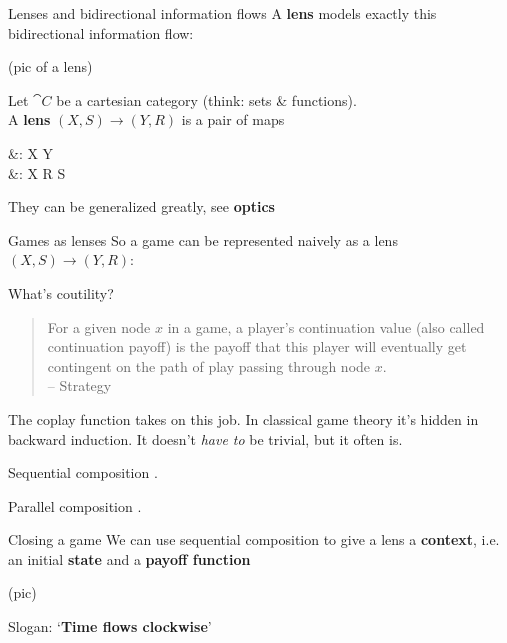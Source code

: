 \begin{frame}{Lenses and bidirectional information flows}
	A \textbf{lens} models exactly this bidirectional information flow:

	(pic of a lens)

	\begin{definition}
		Let $\cat C$ be a cartesian category (think: sets \& functions).\\
		A \textbf{lens} $(X,S) \to (Y,R)$ is a pair of maps
		\begin{eqalign*}
			 &: X \to Y\\
			 &: X \times R \to S
		\end{eqalign*}
	\end{definition}
	{\color{colornote}They can be generalized greatly, see \textbf{optics} \cite{reilly}}
\end{frame}

\begin{frame}{Games as lenses}
	So a game can be represented naively as a lens $(X,S) \to (Y,R)$:

\end{frame}

\begin{frame}{What's coutility?}

	\vfill
	\begin{quotation}
		For a given node $x$ in a game, a player’s continuation value (also called continuation payoff) is the payoff that this player will eventually get contingent on the path of play passing through node $x$.\\
		{\color{colornote}-- Strategy \cite{strategy}}
	\end{quotation}

	\vfill
	The coplay function takes on this job. In classical game theory it's hidden in backward induction.
	It doesn't \emph{have to} be trivial, but it often is.
\end{frame}

\begin{frame}{Sequential composition}
.
\end{frame}

\begin{frame}{Parallel composition}
.
\end{frame}

\begin{frame}{Closing a game}
	We can use sequential composition to give a lens a \textbf{context}, i.e. an initial \textbf{state} and a \textbf{payoff function}

	(pic)

	Slogan: `\textbf{Time flows clockwise}'
\end{frame}

